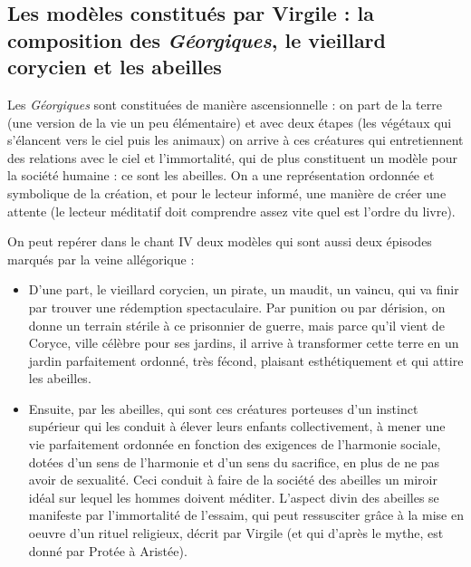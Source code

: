 \documentclass[a4paper,12pt]{book}
\begin{document}
\subsection{Les modèles constitués par Virgile : la composition des \textit{Géorgiques}, le vieillard corycien et les abeilles}
Les \textit{Géorgiques} sont constituées de manière ascensionnelle : on part de la terre (une version de la vie un peu élémentaire) et avec deux étapes (les végétaux qui s'élancent vers le ciel puis les animaux) on arrive à ces créatures qui entretiennent des relations avec le ciel et l'immortalité, qui de plus constituent un modèle pour la société humaine : ce sont les abeilles. On a une représentation ordonnée et symbolique de la création, et pour le lecteur informé, une manière de créer une attente (le lecteur méditatif doit comprendre assez vite quel est l'ordre du livre).
\par On peut repérer dans le chant IV deux modèles qui sont aussi deux épisodes marqués par la veine allégorique :\begin{itemize}
\item D'une part, le vieillard corycien, un pirate, un maudit, un vaincu, qui va finir par trouver une rédemption spectaculaire. Par punition ou par dérision, on donne un terrain stérile à ce prisonnier de guerre, mais parce qu'il vient de Coryce, ville célèbre pour ses jardins, il arrive à transformer cette terre en un jardin parfaitement ordonné, très fécond, plaisant esthétiquement et qui attire les abeilles.
\item Ensuite, par les abeilles, qui sont ces créatures porteuses d'un instinct supérieur qui les conduit à élever leurs enfants collectivement, à mener une vie parfaitement ordonnée en fonction des exigences de l'harmonie sociale, dotées d'un sens de l'harmonie et d'un sens du sacrifice, en plus de ne pas avoir de sexualité. Ceci conduit à faire de la société des abeilles un miroir idéal sur lequel les hommes doivent méditer. L'aspect divin des abeilles se manifeste par l'immortalité de l'essaim, qui peut ressusciter grâce à la mise en oeuvre d'un rituel religieux, décrit par Virgile (et qui d'après le mythe, est donné par Protée à Aristée). 
\end{itemize}
\end{document}
